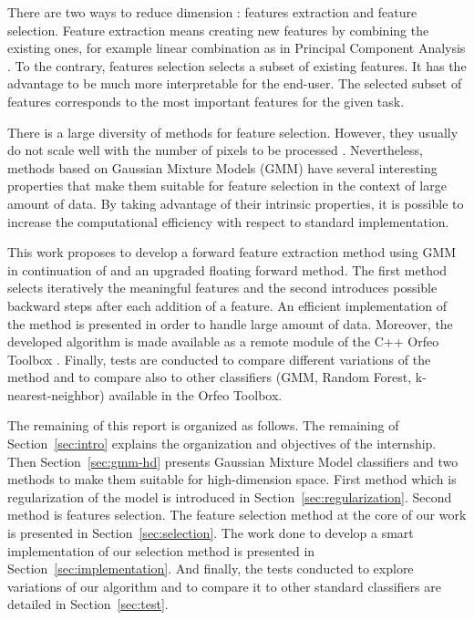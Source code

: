 \documentclass[a4paper,11pt,DIV=16,abstracton]{scrartcl}
\begin{document}
    There are two ways to reduce dimension \cite{Guyon:2006:FEF:1208773}: features extraction and feature selection. Feature extraction means creating new features by combining the existing ones, for example linear combination as in Principal Component Analysis \cite{jimenez1998supervised}. To the contrary, features selection selects a subset of existing features. It has the advantage to be much more interpretable for the end-user. The selected subset of features corresponds to the most important features for the given task.

    There is a large diversity of methods for feature selection. However, they usually do not scale well with the number of pixels to be processed \cite{fauvel2015fast}. Nevertheless, methods based on Gaussian Mixture Models (GMM) have several interesting properties that make them suitable for feature selection in the context of large amount of data. By taking advantage of their intrinsic properties, it is possible to increase the computational efficiency with respect to standard implementation.

    This work proposes to develop a forward feature extraction method using GMM in continuation of \cite{fauvel2015fast} and an upgraded floating forward method. The first method selects iteratively the meaningful features and the second introduces possible backward steps after each addition of a feature. An efficient implementation of the method is presented in order to handle large amount of data. Moreover, the developed algorithm is made available as a remote module of the C++ Orfeo Toolbox \cite{christophe2008orfeo}. Finally, tests are conducted to compare different variations of the method and to compare also to other classifiers (GMM, Random Forest, k-nearest-neighbor) available in the Orfeo Toolbox.

    The remaining of this report is organized as follows. The remaining of Section~\ref{sec:intro} explains the organization and objectives of the internship. Then Section~\ref{sec:gmm-hd} presents Gaussian Mixture Model classifiers and two methods to make them suitable for high-dimension space. First method which is regularization of the model is introduced in Section~\ref{sec:regularization}. Second method is features selection. The feature selection method at the core of our work is presented in Section~\ref{sec:selection}. The work done to develop a smart implementation of our selection method is presented in Section~\ref{sec:implementation}. And finally, the tests conducted to explore variations of our algorithm and to compare it to other standard classifiers are detailed in Section~\ref{sec:test}.
\end{document}
